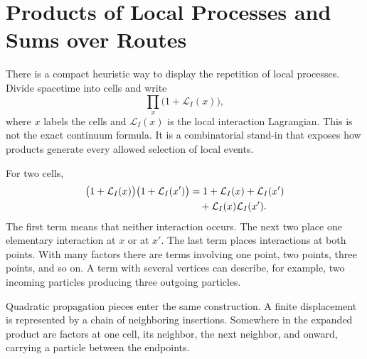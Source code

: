 \section{Products of Local Processes and Sums over Routes}

There is a compact heuristic way to display the repetition of local processes. Divide spacetime into cells and write
\begin{equation}
\prod_x\bigl(1+\mathcal L_I(x)\bigr),
\end{equation}
where \(x\) labels the cells and \(\mathcal L_I(x)\) is the local interaction Lagrangian. This is not the exact continuum formula. It is a combinatorial stand-in that exposes how products generate every allowed selection of local events.

\begin{classroomqa}
\end{classroomqa}

For two cells,
\begin{align}
\bigl(1+\mathcal L_I(x)\bigr)
\bigl(1+\mathcal L_I(x')\bigr)
&=
1+\mathcal L_I(x)+\mathcal L_I(x')
\notag\\
&\quad{}+\mathcal L_I(x)\mathcal L_I(x').
\end{align}
The first term means that neither interaction occurs. The next two place one elementary interaction at \(x\) or at \(x'\). The last term places interactions at both points. With many factors there are terms involving one point, two points, three points, and so on. A term with several vertices can describe, for example, two incoming particles producing three outgoing particles.

Quadratic propagation pieces enter the same construction. A finite displacement is represented by a chain of neighboring insertions. Somewhere in the expanded product are factors at one cell, its neighbor, the next neighbor, and onward, carrying a particle between the endpoints.

\begin{classroomqa}
\end{classroomqa}

